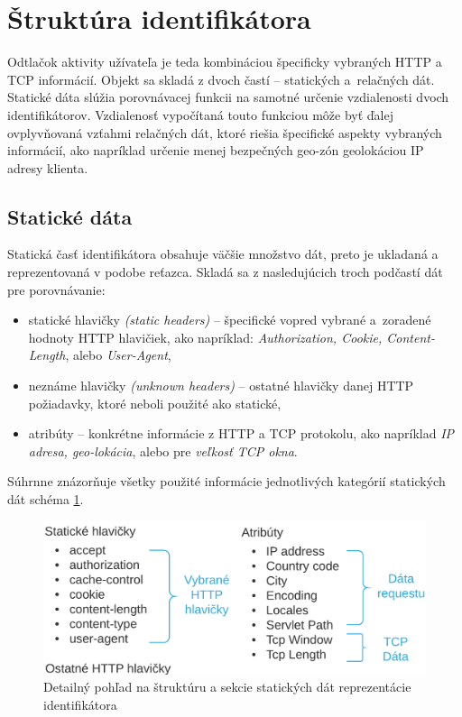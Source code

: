 \documentclass[
  digital, %
  oneside, %
  table,   %
  lof,     %
  nolot,   %
  nocover
]{fithesis3}
\begin{document}
\section{Štruktúra identifikátora}
\label{s:footprint-structure}
Odtlačok aktivity užívateľa je teda kombináciou špecificky vybraných HTTP a TCP informácií.
Objekt sa skladá z dvoch častí -- statických a~relačných dát. Statické
dáta slúžia porovnávacej funkcii na samotné
určenie vzdialenosti dvoch identifikátorov. Vzdialenosť vypočítaná touto
funkciou môže byť ďalej ovplyvňovaná vzťahmi relačných dát, ktoré riešia
špecifické aspekty vybraných informácií, ako napríklad určenie menej bezpečných
geo-zón geolokáciou IP adresy klienta.

\subsection{Statické dáta}
Statická časť identifikátora obsahuje väčšie množstvo dát, preto je
ukladaná a reprezentovaná v podobe reťazca. Skladá sa z nasledujúcich troch podčastí dát pre porovnávanie:
\begin{itemize}
    \item statické hlavičky \textit{(static headers)} -- špecifické vopred
    vybrané a~zoradené hodnoty HTTP hlavičiek, ako napríklad: \textit{Authorization, Cookie, Content-Length}, alebo
    \textit{User-Agent},
    \item neznáme hlavičky \textit{(unknown headers)} -- ostatné hlavičky danej
    HTTP požiadavky, ktoré neboli použité ako statické,
    \item atribúty -- konkrétne informácie z HTTP a TCP protokolu, ako napríklad
    \textit{IP adresa, geo-lokácia}, alebo pre \textit{veľkosť TCP okna}.
\end{itemize}
Súhrnne znázorňuje všetky použité informácie jednotlivých kategórií statických dát schéma
\ref{fig:footprint-data-static}.

\begin{figure}[t]
  \centering
    \includegraphics[width=.97\textwidth]{images/footprint-data-static.png}
  \caption{Detailný pohľad na štruktúru a sekcie statických dát reprezentácie identifikátora}
  \label{fig:footprint-data-static}
\end{figure}
\end{document}

